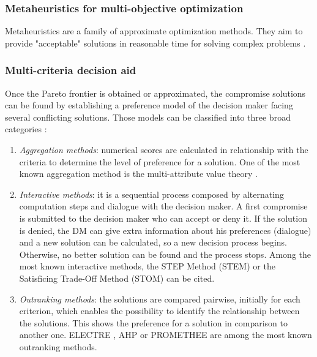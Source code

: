 \subsubsection{Metaheuristics for multi-objective optimization}
Metaheuristics are a family of approximate optimization methods. They aim to provide "acceptable" solutions in reasonable time for solving complex problems \cite{talbi09}.

\subsubsection{Multi-criteria decision aid}
Once the Pareto frontier is obtained or approximated, the compromise solutions can be found by establishing a preference model of the decision maker facing several conflicting solutions. Those models can be classified into three broad categories \cite{Vin92, beltstew}:

\begin{enumerate}
\item \textit{Aggregation methods}: numerical scores are calculated in relationship with the criteria to determine the level of preference for a solution. One of the most known aggregation method is the multi-attribute value theory \cite{MMAUT}.
\item \textit{Interactive methods}: it is a sequential process composed by alternating computation steps and dialogue with the decision maker. A first compromise is submitted to the decision maker who can accept or deny it. If the solution is denied, the DM can give extra information about his preferences (dialogue) and a new solution can be calculated, so a new decision process begins. Otherwise, no better solution can be found and the process stops. Among the most known interactive methods, the STEP Method (STEM) \cite{benayoun71} or the Satisficing Trade-Off Method (STOM) \cite{nakayama84} can be cited.
\item \textit{Outranking methods}: the solutions are compared pairwise, initially for each criterion, which enables the possibility to identify the relationship between the solutions. This shows the preference for a solution in comparison to another one. ELECTRE \cite{Roy66}, AHP \cite{MAHP} or PROMETHEE \cite{Brans1} are among the most known outranking methods.
\end{enumerate}


